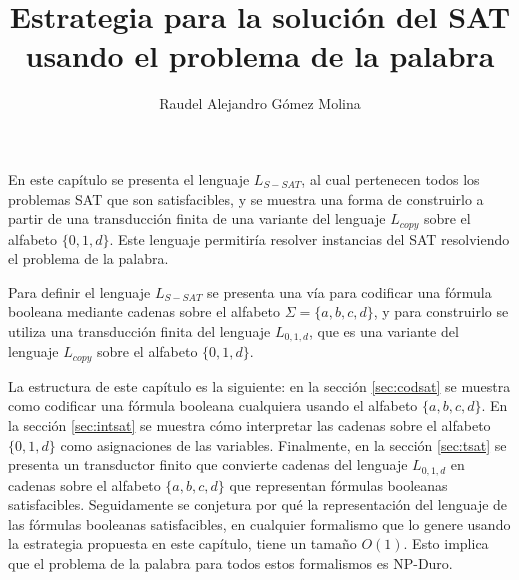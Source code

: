 \documentclass[12pt]{article}
\title{Estrategia para la solución del SAT usando el problema de la palabra}
\author{Raudel Alejandro Gómez Molina}
\begin{document}
\maketitle





En este capítulo se presenta el lenguaje $L_{S-SAT}$, al cual pertenecen todos los problemas SAT que son 
satisfacibles, y se muestra una forma de construirlo a partir de una transducción finita de una variante 
del lenguaje $L_{copy}$ sobre el alfabeto $\{0,1,d\}$. Este lenguaje permitiría resolver instancias del SAT resolviendo el problema de la palabra.  

Para definir el lenguaje $L_{S-SAT}$ se presenta una vía para codificar una fórmula booleana mediante cadenas sobre el alfabeto $\Sigma=\{a, b,c,d\}$, y para construirlo se utiliza una transducción finita del lenguaje $L_{0,1,d}$, que es una variante del lenguaje $L_{copy}$ sobre el alfabeto $\{0,1,d\}$.

La estructura de este capítulo es la siguiente: en la sección \ref{sec:codsat} se muestra como codificar una fórmula booleana cualquiera usando el alfabeto $\{a,b,c,d\}$. En la sección \ref{sec:intsat} se muestra cómo interpretar las cadenas sobre el alfabeto $\{0,1,d\}$ como asignaciones de las variables. Finalmente, en la sección \ref{sec:tsat} se presenta un transductor finito que convierte cadenas del lenguaje $L_{0,1,d}$ en cadenas sobre el alfabeto $\{a,b,c,d\}$ que representan fórmulas booleanas satisfacibles. Seguidamente se conjetura por qué la representación del lenguaje de las fórmulas booleanas satisfacibles, en cualquier formalismo que lo genere usando la estrategia propuesta en este capítulo, tiene un tamaño $O(1)$. Esto implica que el problema de la palabra para todos estos formalismos es NP-Duro.
\end{document}
